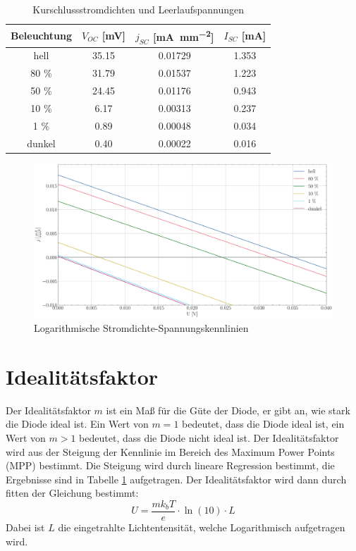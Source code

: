 \documentclass[12pt,a4paper,ngerman]{report}
\begin{document}
\begin{table}[h!]
	\centering
	\begin{tabular}{c c c c}
		\toprule[1.5pt]
		Beleuchtung & $V_{OC}$ [\si{\milli \volt}] & $j_{SC}$ [\si{\milli \ampere \per \milli \meter \squared}] & $I_{SC}$ [\si{\milli \ampere}] \\
		\midrule
		hell        & 35.15  &  0.01729  & 1.353      \\
		80 \%       & 31.79  &  0.01537  & 1.223            \\
		50 \%       & 24.45  &  0.01176  & 0.943            \\
		10 \%       & 6.17   &  0.00313  & 0.237          \\
		1  \%       & 0.89   &  0.00048  & 0.034          \\
		dunkel      & 0.40   &  0.00022  & 0.016          \\
		\bottomrule[1.5pt]
	\end{tabular}
	\caption{Kurschlussstromdichten und Leerlaufspannungen}\label{table:KurzschlussLeerlauf}
\end{table}
\begin{figure} 
	\centering
	\includegraphics[width=\textwidth]{Bilder/KennlinienLOG.pdf}
	\caption{Logarithmische Stromdichte-Spannungskennlinien}
	\label{img:KennlinienLOG}
\end{figure}

\section{Idealitätsfaktor}
Der Idealitätsfaktor $m$ ist ein Maß für die Güte der Diode, er gibt an, wie stark die Diode ideal ist. Ein Wert von $m=1$ bedeutet, dass die Diode ideal ist, ein Wert von $m>1$ bedeutet, dass die Diode nicht ideal ist. Der Idealitätsfaktor wird aus der Steigung der Kennlinie im Bereich des Maximum Power Points (MPP) bestimmt. Die Steigung wird durch lineare Regression bestimmt, die Ergebnisse sind in Tabelle \ref{table:KurzschlussLeerlauf} aufgetragen. Der Idealitätsfaktor wird dann durch fitten der Gleichung bestimmt: 
\[U = \frac{m k_b T}{e} \cdot \ln(10) \cdot L \]
Dabei ist $L$ die eingetrahlte Lichtentensität, welche Logarithmisch aufgetragen wird.\\
\end{document}
